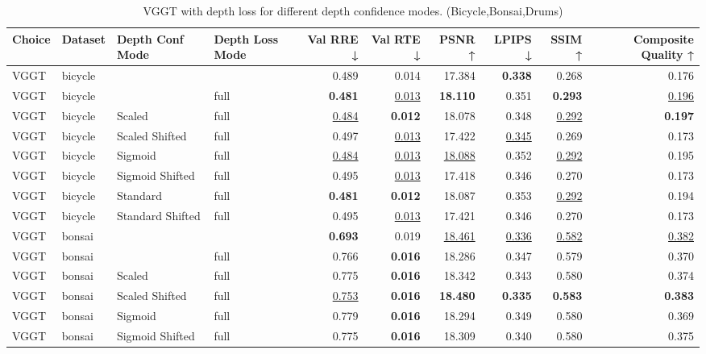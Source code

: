 \begin{table}[H]
\caption{\ifdefined\customcaption \customcaption \else VGGT with depth loss for different depth confidence modes. (Bicycle,Bonsai,Drums) \fi}
\label{tab:05_depth_conf_mode_bicycle,bonsai,drums}
\centering
\scriptsize
\begin{tabular}{llllrrrrrr}
\toprule
Choice & Dataset & Depth Conf Mode & Depth Loss Mode & Val RRE ↓ & Val RTE ↓ & PSNR ↑ & LPIPS ↓ & SSIM ↑ & Composite Quality ↑ \\
\midrule
VGGT & bicycle &  &  & 0.489 & 0.014 & 17.384 & \textbf{0.338} & 0.268 & 0.176 \\
VGGT & bicycle &  & full & \textbf{0.481} & \underline{0.013} & \textbf{18.110} & 0.351 & \textbf{0.293} & \underline{0.196} \\
VGGT & bicycle & Scaled & full & \underline{0.484} & \textbf{0.012} & 18.078 & 0.348 & \underline{0.292} & \textbf{0.197} \\
VGGT & bicycle & Scaled Shifted & full & 0.497 & \underline{0.013} & 17.422 & \underline{0.345} & 0.269 & 0.173 \\
VGGT & bicycle & Sigmoid & full & \underline{0.484} & \underline{0.013} & \underline{18.088} & 0.352 & \underline{0.292} & 0.195 \\
VGGT & bicycle & Sigmoid Shifted & full & 0.495 & \underline{0.013} & 17.418 & 0.346 & 0.270 & 0.173 \\
VGGT & bicycle & Standard & full & \textbf{0.481} & \textbf{0.012} & 18.087 & 0.353 & \underline{0.292} & 0.194 \\
VGGT & bicycle & Standard Shifted & full & 0.495 & \underline{0.013} & 17.421 & 0.346 & 0.270 & 0.173 \\
\midrule
VGGT & bonsai &  &  & \textbf{0.693} & 0.019 & \underline{18.461} & \underline{0.336} & \underline{0.582} & \underline{0.382} \\
VGGT & bonsai &  & full & 0.766 & \textbf{0.016} & 18.286 & 0.347 & 0.579 & 0.370 \\
VGGT & bonsai & Scaled & full & 0.775 & \textbf{0.016} & 18.342 & 0.343 & 0.580 & 0.374 \\
VGGT & bonsai & Scaled Shifted & full & \underline{0.753} & \textbf{0.016} & \textbf{18.480} & \textbf{0.335} & \textbf{0.583} & \textbf{0.383} \\
VGGT & bonsai & Sigmoid & full & 0.779 & \textbf{0.016} & 18.294 & 0.349 & 0.580 & 0.369 \\
VGGT & bonsai & Sigmoid Shifted & full & 0.775 & \textbf{0.016} & 18.309 & 0.340 & 0.580 & 0.375 \\

\end{tabular}
\end{table}
